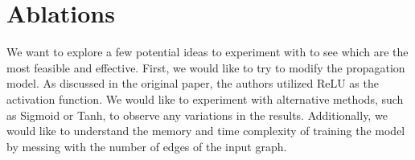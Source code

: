 \documentclass[11pt,a4paper]{article}
\begin{document}
\section{Ablations}

We want to explore a few potential ideas to experiment with to see which are the most feasible and effective. First, we would like to try to modify the propagation model. As discussed in the original paper, the authors utilized ReLU as the activation function. We would like to experiment with alternative methods, such as Sigmoid or Tanh, to observe any variations in the results. Additionally, we would like to understand the memory and time complexity of training the model by messing with the number of edges of the input graph.








\end{document}

